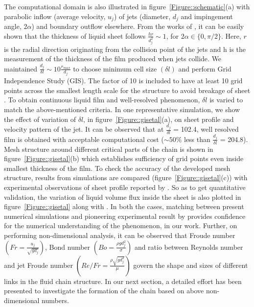 \documentclass{jfm}
\begin{document}
The computational domain is also illustrated in figure~\ref{Figure::schematic}(a) with parabolic inflow (average velocity, $u_j$) of jets (diameter, $d_j$ and impingement angle, $2\alpha$) and boundary outflow elsewhere. From the works of \cite{choo2001parametric}, it can be easily shown that the thickness of liquid sheet follows $\frac{hr}{d_j^2} \sim 1$, for $2\alpha \in \{0,\pi/2\}$.  Here, $r$ is the radial direction originating from the collision point of the jets and h is the measurement of the thickness of the film produced when jets collide. We maintained $\frac{d_j}{\delta l} \sim 10\frac{r_{max}}{d_j}$ to choose minimum cell size $\left(\delta l\right)$ and perform Grid Independence Study (GIS). The factor of 10 is included to have at least 10 grid points\citep{ling2015multiscale} across the smallest length scale for the structure to avoid breakage of sheet \citep{chen2013high}. To obtain continuous liquid film and well-resolved phenomenon, $\delta l$ is varied to match the above-mentioned criteria. In one representative simulation, we show the effect of variation of $\delta l$, in figure~\ref{Figure::gisetal}(a), on sheet profile and velocity pattern of the jet. It can be observed that at $\frac{d_j}{\delta l}$ = 102.4, well resolved film is obtained with acceptable computational cost ($\sim 50\%$ less than $\frac{d_j}{\delta l}$ = 204.8). Mesh structure around different critical parts of the chain is shown in figure~\ref{Figure::gisetal}(b) which establishes sufficiency of grid points even inside smallest thickness of the film. To check the accuracy of the developed mesh structure, results from simulations are compared (figure~\ref{Figure::gisetal}(c)) with experimental observations of sheet profile reported by \cite{bush2004collision}. So as to get quantitative validation, the variation of liquid volume flux inside the sheet is also plotted in figure~\ref{Figure::gisetal} along with \cite{bush2004collision}. In both the cases, matching between present numerical simulations and pioneering experimental result by \cite{bush2004collision} provides confidence for the numerical understanding of the phenomenon, in our work. Further, on performing non-dimensional analysis, it can be observed that Froude number $\left(Fr = \frac{u_j}{\sqrt{gd_j}}\right)$, Bond number $\left(Bo = \frac{\rho gd_j^2}{\sigma}\right)$ and ratio between Reynolds number and jet Froude number $\left(Re/Fr = \frac{\rho\sqrt{gd_j^3}}{\mu}\right)$ govern the shape and sizes of different links in the fluid chain structure. In our next section, a detailed effort has been presented to investigate the formation of the chain based on above non-dimensional numbers.
\end{document}
